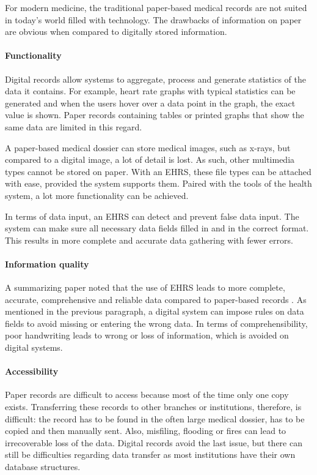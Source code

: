         For modern medicine, the traditional paper-based medical records are not suited in today's world filled with technology. The drawbacks of information on paper are obvious when compared to digitally stored information.

        \paragraph{Functionality} Digital records allow systems to aggregate, process and generate statistics of the data it contains. For example, heart rate graphs with typical statistics can be generated and when the users hover over a data point in the graph, the exact value is shown. Paper records containing tables or printed graphs that show the same data are limited in this regard.

        A paper-based medical dossier can store medical images, such as x-rays, but compared to a digital image, a lot of detail is lost. As such, other multimedia types cannot be stored on paper. With an EHRS, these file types can be attached with ease, provided the system supports them. Paired with the tools of the health system, a lot more functionality can be achieved.

        In terms of data input, an EHRS can detect and prevent false data input. The system can make sure all necessary data fields filled in and in the correct format. This results in more complete and accurate data gathering with fewer errors.

        \paragraph{Information quality} A summarizing paper noted that the use of EHRS leads to more complete, accurate, comprehensive and reliable data compared to paper-based records \cite{ehrs_summary}. As mentioned in the previous paragraph, a digital system can impose rules on data fields to avoid missing or entering the wrong data. In terms of comprehensibility, poor handwriting leads to wrong or loss of information, which is avoided on digital systems.

        \paragraph{Accessibility} Paper records are difficult to access because most of the time only one copy exists. Transferring these records to other branches or institutions, therefore, is difficult: the record has to be found in the often large medical dossier, has to be copied and then manually sent. Also, misfiling, flooding or fires can lead to irrecoverable loss of the data. Digital records avoid the last issue, but there can still be difficulties regarding data transfer as most institutions have their own database structures.


